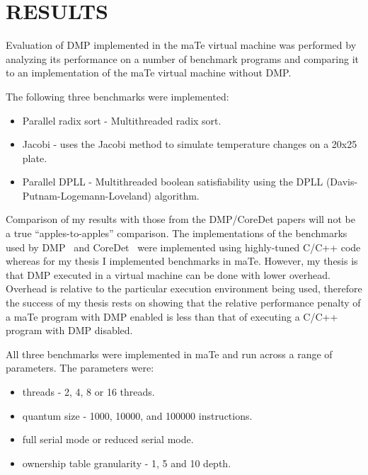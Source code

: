 \chapter{RESULTS}
\label{RESULTS}

Evaluation of DMP implemented in the maTe virtual machine was
performed by analyzing its performance on a number of benchmark
programs and comparing it to an implementation of the maTe virtual
machine without DMP.

The following three benchmarks were implemented:

\begin{itemize}
\item Parallel radix sort - Multithreaded radix sort.

\item Jacobi - uses the Jacobi method to simulate temperature changes
  on a 20x25 plate.

\item Parallel DPLL - Multithreaded boolean satisfiability using the
  DPLL (Davis-Putnam-Logemann-Loveland) algorithm.
\end{itemize}

Comparison of my results with those from the DMP/CoreDet papers will
not be a true ``apples-to-apples'' comparison.  The implementations of
the benchmarks used by DMP~\cite{dmp} and CoreDet~\cite{coredet} were
implemented using highly-tuned C/C++ code whereas for my thesis I
implemented benchmarks in maTe.  However, my thesis is that DMP
executed in a virtual machine can be done with lower overhead.
Overhead is relative to the particular execution environment being
used, therefore the success of my thesis rests on showing that the
relative performance penalty of a maTe program with DMP enabled is
less than that of executing a C/C++ program with DMP disabled.

All three benchmarks were implemented in maTe and run across a range
of parameters.  The parameters were:

\begin{itemize}
\item threads - 2, 4, 8 or 16 threads.

\item quantum size - 1000, 10000, and 100000 instructions.

\item full serial mode or reduced serial mode.

\item ownership table granularity - 1, 5 and 10 depth.
\end{itemize}

